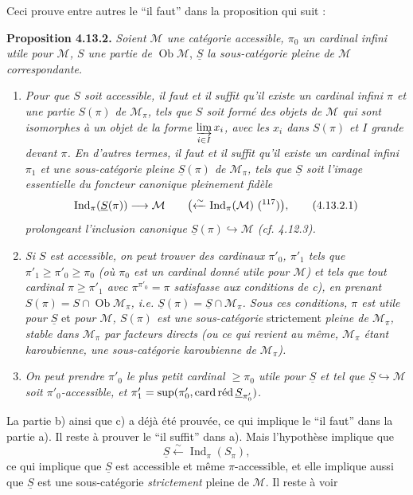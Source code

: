 \documentclass[11pt]{article}
\newcommand{\printedpage}[1]{\marginpar{\footnotesize p.~#1}}
\newcommand{\msp}[1]{\marginpar{\footnotesize [#1]}}
\newcommand{\M}{\mathcal{M}}
\newcommand{\Ind}{\operatorname{Ind}}
\newcommand{\Ob}{\operatorname{Ob}}
\newcommand{\card}{\operatorname{card}}
\newcommand{\red}{\mathop{\textup{réd}}\nolimits}
\newcommand{\uS}{\underline{S}}
\begin{document}
Ceci prouve entre autres le “il faut” dans la proposition qui suit :

\textbf{Proposition 4.13.2.} \textit{Soient $\M$ une catégorie accessible, $\pi_0$ un cardinal infini utile pour $\M$, $S$ une partie de} $\Ob\M$, \textit{$\uS$ la sous-catégorie pleine de $\M$ correspondante.}

\msp{page 284}
\begin{enumerate}
\item[\textit{a)}] \textit{Pour que $S$ soit accessible, il faut et il suffit qu'il existe un cardinal infini $\pi$ et une partie $S(\pi)$ de $\M_\pi$, tels que $S$ soit formé des objets de $\M$ qui sont isomorphes à un objet de la forme $\varinjlim\limits_{i\in I} x_i$, avec les $x_i$ dans $S(\pi)$ et $I$ grande devant $\pi$. En d'autres termes, il faut et il suffit qu'il existe un cardinal infini $\pi_1$ et une sous-catégorie pleine %
$\uS(\pi)$ de $\M_\pi$, tels que $\uS$ soit l'image essentielle du foncteur canonique pleinement fidèle}
\[
\Ind_\pi(\uS(\pi)) \longrightarrow \M \qquad \bigl(\xleftarrow{\sim} \Ind_\pi(\M)\ \text{(\footnotemark[117])}\bigr) , \tag*{(4.13.2.1)} %
\]
\footnotetext[117]{si $\pi$ utile pour $\M$.}
\textit{prolongeant l'inclusion canonique $\uS(\pi) \hookrightarrow \M$ (cf. 4.12.3).}
\item[\textit{b)}] \printedpage{106}
\textit{Si $S$ est accessible, on peut trouver des cardinaux $\pi'_0$, $\pi'_1$ tels que $\pi'_1 \geqslant \pi'_0 \geqslant \pi_0$ (où $\pi_0$ est un cardinal donné utile pour $\M$)}
\msp{page 285}
\textit{et tels que tout cardinal $\pi \geqslant \pi'_1$ avec $\pi^{\pi'_0} = \pi$ satisfasse aux conditions de c), en prenant $S(\pi) = S \cap \Ob\M_\pi$, i.e. $\uS(\pi) = \uS \cap \M_\pi$. Sous ces conditions, $\pi$ est utile pour $\uS$} et \textit{pour $\M$, $S(\pi)$ est une sous-catégorie} strictement \textit{pleine de $\M_\pi$, stable dans $\M_\pi$ par facteurs directs (ou ce qui revient au même, $\M_\pi$ étant karoubienne, une sous-catégorie karoubienne de $\M_\pi$).}
\item[\textit{c)}] \textit{On peut prendre $\pi'_0$ le plus petit cardinal $\geqslant \pi_0$ utile pour $\uS$ et tel que $\uS \hookrightarrow \M$ soit $\pi'_0$-accessible, et $\pi'_1 = \sup(\pi'_0, \card\red\uS_{\pi'_0})$.}
\end{enumerate}

La partie b) ainsi que c) a déjà été prouvée, ce qui implique le “il faut” dans la partie a). Il reste à prouver le “il suffit” dans a). Mais l'hypothèse implique que
\[
\uS \xleftarrow{\sim} \Ind_\pi(S_\pi) ,
\]
ce qui implique que $\uS$ est accessible et même $\pi$-accessible, et elle implique aussi que $\uS$ est une sous-catégorie \textit{strictement} pleine de $\M$. Il reste à voir
\end{document}
